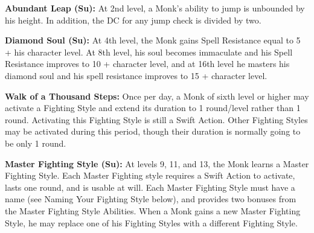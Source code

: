 \textbf{Abundant Leap (Su):} At 2nd level, a Monk's ability to jump is unbounded by his height. In addition, the DC for any jump check is divided by two.

\textbf{Diamond Soul (Su):} At 4th level, the Monk gains Spell Resistance equal to 5 + his character level. At 8th level, his soul becomes immaculate and his Spell Resistance improves to 10 + character level, and at 16th level he masters his diamond soul and his spell resistance improves to 15 + character level.

\textbf{Walk of a Thousand Steps:} Once per day, a Monk of sixth level or higher may activate a Fighting Style and extend its duration to 1 round/level rather than 1 round. Activating this Fighting Style is still a Swift Action. Other Fighting Styles may be activated during this period, though their duration is normally going to be only 1 round.

\textbf{Master Fighting Style (Su):} At levels 9, 11, and 13, the Monk learns a Master Fighting Style. Each Master Fighting style requires a Swift Action to activate, lasts one round, and is usable at will. Each Master Fighting Style must have a name (see Naming Your Fighting Style below), and provides two bonuses from the Master Fighting Style Abilities. When a Monk gains a new Master Fighting Style, he may replace one of his Fighting Styles with a different Fighting Style.

